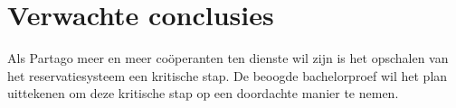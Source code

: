 
\section{Verwachte conclusies}
\label{sec:verwachte_conclusies}
Als Partago meer en meer coöperanten ten dienste wil zijn is het opschalen van het reservatiesysteem een kritische stap. De beoogde bachelorproef wil het plan uittekenen om deze kritische stap op een doordachte manier te nemen.  
